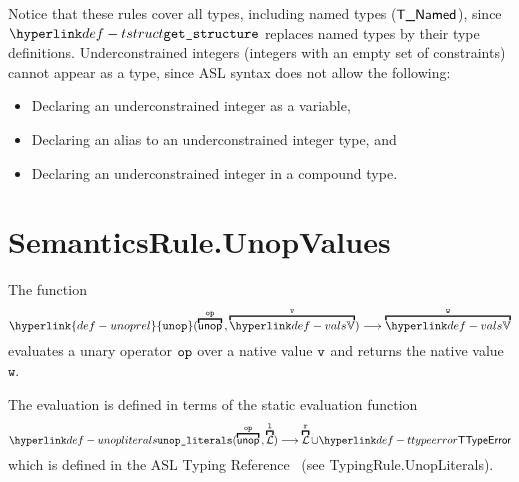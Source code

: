 \documentclass{book}
\newcommand\unoprel[0]{\hyperlink{def-unoprel}{\texttt{unop}}}
\newcommand\vl[0]{\texttt{l}}
\newcommand\vw[0]{\texttt{w}}
\begin{document}
\begin{emptyformal}
Notice that these rules cover all types, including named types ($\textsf{T\_Named}$),
since $\tstruct$ replaces named types by their type definitions.
%
Underconstrained integers (integers with an empty set of constraints)
cannot appear as a type, since ASL syntax does not allow the following:
\begin{itemize}
\item Declaring an underconstrained integer as a variable,
\item Declaring an alias to an underconstrained integer type, and
\item Declaring an underconstrained integer in a compound type.
\end{itemize}
\end{emptyformal}

\section{SemanticsRule.UnopValues \label{sec:SemanticsRule.UnopValues}}
\hypertarget{def-unoprel}{}
The function
\[
  \unoprel(\overname{\unop}{\op} \aslsep \overname{\vals}{\vv}) \aslto \overname{\vals}{\vw}
\]
evaluates a unary operator $\texttt{op}$ over a native value $\texttt{v}$ and returns the native value $\vw$.

The evaluation is defined in terms of the static evaluation function
\hypertarget{def-unopliterals}{}
\[
  \unopliterals(\overname{\unop}{\op} \aslsep \overname{\literals}{\vl}) \aslto
  \overname{\literals}{\vr} \cup \TTypeError
\]
which is defined in the ASL Typing Reference~\cite{ASLTypingReference} (see TypingRule.UnopLiterals).
\end{document}
